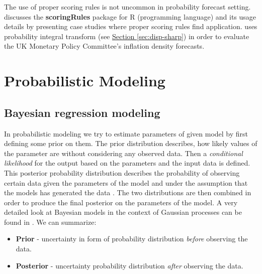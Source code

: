 \documentclass[12pt,a4paper,twoside]{scrartcl}
\numberwithin{equation}{section}
\newcommand{\refsec}[1]{\hyperref[#1]{Section \ref*{#1}}}
\begin{document}
The use of proper scoring rules is not uncommon in  probability forecast setting. \cite{jordan2017} discusses the \textbf{scoringRules} package for R (programming language) and its usage details by presenting case studies where proper scoring rules find application. \cite{clements2004} uses probability integral transform (see \refsec{sec:disp-sharp}) in order to evaluate the UK Monetary Policy Committee's inflation density forecasts.

\section{Probabilistic Modeling}
\label{sec:prob-modeling}

\subsection{Bayesian regression modeling}
\label{sec:bayesian-inference}
In probabilistic modeling we try to estimate parameters of given model by first defining some prior on them. The prior distribution describes, how likely values of the parameter are without considering any observed data. Then a \emph{conditional likelihood} for the output based on the parameters and the input data is defined. This posterior probability distribution describes the probability of observing certain data given the parameters of the model and under the assumption that the models has generated the data . The two distributions are then combined in order to produce the final posterior on the parameters of the model. A very detailed look at Bayesian models in the context of Gaussian processes can be found in \cite{rasmussen2005}. We can summarize:
\begin{itemize}
\item \textbf{Prior} - uncertainty in form of probability distribution \emph{before} observing the data.
\item \textbf{Posterior} - uncertainty probability distribution \emph{after} observing the data.
\end{itemize}
\end{document}

